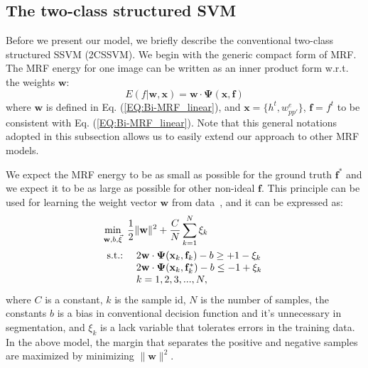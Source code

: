 \documentclass[10pt,journal,compsoc]{newIEEEtran}
\begin{document}
\subsection{The two-class structured SVM}
Before we present our model, we briefly describe the conventional two-class structured SSVM (2CSSVM). We begin with the generic compact form of MRF. The MRF energy for one image can be written as an inner product form w.r.t. the weights $\mathbf{w}$:
\begin{equation}
E(f|\mathbf{w},\mathbf{x}) %
                = \mathbf{w}\cdot \mathbf{\Psi}(\mathbf{x},\mathbf{f})
\end{equation}
where $\mathbf{w}$ is defined in Eq. (\ref{EQ:Bi-MRF_linear}), and $\mathbf{x}=\{h^t,w_{pp'}^e\}$, $\mathbf{f}=f^t$ to be consistent with Eq. (\ref{EQ:Bi-MRF_linear}). Note that this general notations adopted in this subsection allows us to easily extend our approach to other MRF models.

We expect the MRF energy to be as small as possible for the ground truth $\mathbf{f}^*$ and we expect it to be as large as possible for other non-ideal $\mathbf{f}$. 
This principle can be used for learning the weight vector $\mathbf{w}$ from data~\cite{Taskar05LargeMargin,Tsochantaridis05LargeMarginSSVM}, and it can be expressed as:\vspace{-3mm}\begin{equation}\label{EQ:2C_SSVM}
\begin{split}
&\min_{\mathbf{w},b,\vec{\xi}}~ {1\over2}\|\mathbf{w}\|^2 + {C\over N}\sum_{k=1}^N \xi_k \\
& \begin{array}{rl}
                  \hbox{s.t.:}&~ 2\mathbf{w}\cdot\mathbf{\Psi}(\mathbf{x}_k,\mathbf{f}_k)-b\geq +1 - \xi_k %
                   \\
                   &~2\mathbf{w}\cdot\mathbf{\Psi}(\mathbf{x}_k,\mathbf{f}_k^*)-b\leq -1 + \xi_k\\ %
                   &~k=1,2,3,...,N,
\end{array}
\end{split}
\end{equation}
where $C$ is a constant, $k$ is the sample id, $N$ is the number of samples, the constants $b$ is a bias in conventional decision function and it's unnecessary in segmentation, and $\xi_k$ is a lack variable that tolerates errors in the training data. In the above model, the margin that separates the positive and negative samples are maximized by minimizing $\|\mathbf{w}\|^2$.%
\end{document}
